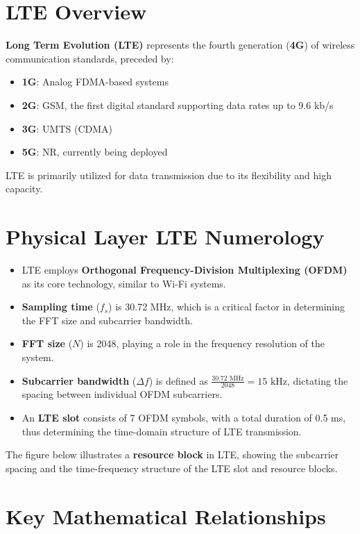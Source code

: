 \section*{LTE Overview}

\textbf{Long Term Evolution (LTE)} represents the fourth generation (\textbf{4G}) of wireless communication standards, preceded by:
\begin{itemize}
    \item \textbf{1G}: Analog FDMA-based systems
    \item \textbf{2G}: GSM, the first digital standard supporting data rates up to 9.6 kb/s
    \item \textbf{3G}: UMTS (CDMA)
    \item \textbf{5G}: NR, currently being deployed
\end{itemize}
LTE is primarily utilized for data transmission due to its flexibility and high capacity.

\section*{Physical Layer LTE Numerology}

\begin{itemize}
    \item LTE employs \textbf{Orthogonal Frequency-Division Multiplexing (OFDM)} as its core technology, similar to Wi-Fi systems.
    \item \textbf{Sampling time} (\(f_s\)) is 30.72 MHz, which is a critical factor in determining the FFT size and subcarrier bandwidth.
    \item \textbf{FFT size} (\(N\)) is 2048, playing a role in the frequency resolution of the system.
    \item \textbf{Subcarrier bandwidth} (\(\Delta f\)) is defined as \(\frac{30.72 \text{ MHz}}{2048} = 15 \text{ kHz}\), dictating the spacing between individual OFDM subcarriers.
    \item An \textbf{LTE slot} consists of 7 OFDM symbols, with a total duration of 0.5 ms, thus determining the time-domain structure of LTE transmission.
\end{itemize}

The figure below illustrates a \textbf{resource block} in LTE, showing the subcarrier spacing and the time-frequency structure of the LTE slot and resource blocks.


\section*{Key Mathematical Relationships}

